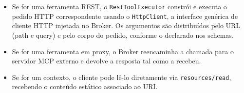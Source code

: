 \begin{itemize}
    \item Se for uma ferramenta REST, o \texttt{RestToolExecutor} constrói e executa o pedido HTTP correspondente usando o \texttt{HttpClient}, a interface genérica de cliente HTTP injetada no Broker. Os argumentos são distribuídos pelo URL (path e query) e pelo corpo do pedido, conforme o declarado nos schemas.
    \item Se for uma ferramenta em proxy, o Broker reencaminha a chamada para o servidor MCP externo e devolve a resposta tal como a recebeu.
    \item Se for um contexto, o cliente pode lê-lo diretamente via \texttt{resources/read}, recebendo o conteúdo estático associado ao URI.
\end{itemize}
